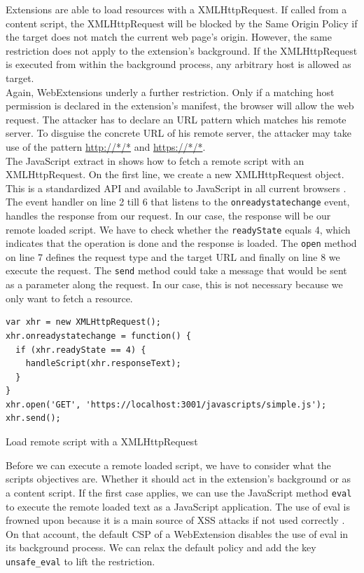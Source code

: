 			Extensions are able to load resources with a XMLHttpRequest. If called from a content script, the XMLHttpRequest will be blocked by the Same Origin Policy if the target does not match the current web page's origin. However, the same restriction does not apply to the extension's background. If the XMLHttpRequest is executed from within the background process, any arbitrary host is allowed as target. \\
			Again, WebExtensions underly a further restriction. Only if a matching host permission is declared in the extension's manifest, the browser will allow the web request. The attacker has to declare an URL pattern which matches his remote server. To disguise the concrete URL of his remote server, the attacker may take use of the pattern \url{http://*/*} and \url{https://*/*}. \\
			The JavaScript extract in  shows how to fetch a remote script with an XMLHttpRequest. On the first line, we create a new XMLHttpRequest object. This is a standardized API and available to JavaScript in all current browsers \cite{w3cXMLHttpRequest}. The event handler on line 2 till 6 that listens to the \texttt{onreadystatechange} event, handles the response from our request. In our case, the response will be our remote loaded script. We have to check whether the \texttt{readyState} equals 4, which indicates that the operation is done and the response is loaded. The \texttt{open} method on line 7 defines the request type and the target URL and finally on line 8 we execute the request. The \texttt{send} method could take a message that would be sent as a parameter along the request. In our case, this is not necessary because we only want to fetch a resource. 
			
			\begin{code}
				\begin{lstlisting}
var xhr = new XMLHttpRequest();
xhr.onreadystatechange = function() {
  if (xhr.readyState == 4) {
    handleScript(xhr.responseText);
  }
}
xhr.open('GET', 'https://localhost:3001/javascripts/simple.js');
xhr.send();
				\end{lstlisting}
				\caption{Load remote script with a XMLHttpRequest}
				\label{xhrLoadScript}
			\end{code}
			
			Before we can execute a remote loaded script, we have to consider what the scripts objectives are. Whether it should act in the extension's background or as a content script. If the first case applies, we can use the JavaScript method \texttt{eval} to execute the remote loaded text as a JavaScript application. The use of eval is frowned upon because it is a main source of XSS attacks if not used correctly \cite{mozillaDangerousEval}. On that account, the default CSP of a WebExtension disables the use of eval in its background process. We can relax the default policy and add the key \texttt{unsafe\_eval} to lift the restriction. \\
			
